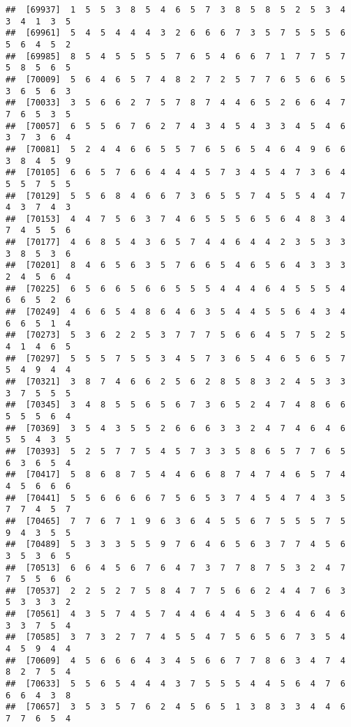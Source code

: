 \documentclass[
]{book}
\begin{document}
\begin{verbatim}
##  [69937]  1  5  5  3  8  5  4  6  5  7  3  8  5  8  5  2  5  3  4  3  4  1  3  5
##  [69961]  5  4  5  4  4  4  3  2  6  6  6  7  3  5  7  5  5  5  6  5  6  4  5  2
##  [69985]  8  5  4  5  5  5  5  7  6  5  4  6  6  7  1  7  7  5  7  5  8  5  6  5
##  [70009]  5  6  4  6  5  7  4  8  2  7  2  5  7  7  6  5  6  6  5  3  6  5  6  3
##  [70033]  3  5  6  6  2  7  5  7  8  7  4  4  6  5  2  6  6  4  7  7  6  5  3  5
##  [70057]  6  5  5  6  7  6  2  7  4  3  4  5  4  3  3  4  5  4  6  3  7  3  6  4
##  [70081]  5  2  4  4  6  6  5  5  7  6  5  6  5  4  6  4  9  6  6  3  8  4  5  9
##  [70105]  6  6  5  7  6  6  4  4  4  5  7  3  4  5  4  7  3  6  4  5  5  7  5  5
##  [70129]  5  5  6  8  4  6  6  7  3  6  5  5  7  4  5  5  4  4  7  4  3  7  4  3
##  [70153]  4  4  7  5  6  3  7  4  6  5  5  5  6  5  6  4  8  3  4  7  4  5  5  6
##  [70177]  4  6  8  5  4  3  6  5  7  4  4  6  4  4  2  3  5  3  3  3  8  5  3  6
##  [70201]  8  4  6  5  6  3  5  7  6  6  5  4  6  5  6  4  3  3  3  2  4  5  6  4
##  [70225]  6  5  6  6  5  6  6  5  5  5  4  4  4  6  4  5  5  5  4  6  6  5  2  6
##  [70249]  4  6  6  5  4  8  6  4  6  3  5  4  4  5  5  6  4  3  4  6  6  5  1  4
##  [70273]  5  3  6  2  2  5  3  7  7  7  5  6  6  4  5  7  5  2  5  4  1  4  6  5
##  [70297]  5  5  5  7  5  5  3  4  5  7  3  6  5  4  6  5  6  5  7  5  4  9  4  4
##  [70321]  3  8  7  4  6  6  2  5  6  2  8  5  8  3  2  4  5  3  3  3  7  5  5  5
##  [70345]  3  4  8  5  5  6  5  6  7  3  6  5  2  4  7  4  8  6  6  5  5  5  6  4
##  [70369]  3  5  4  3  5  5  2  6  6  6  3  3  2  4  7  4  6  4  6  5  5  4  3  5
##  [70393]  5  2  5  7  7  5  4  5  7  3  3  5  8  6  5  7  7  6  5  6  3  6  5  4
##  [70417]  5  8  6  8  7  5  4  4  6  6  8  7  4  7  4  6  5  7  4  4  5  6  6  6
##  [70441]  5  5  6  6  6  6  7  5  6  5  3  7  4  5  4  7  4  3  5  7  7  4  5  7
##  [70465]  7  7  6  7  1  9  6  3  6  4  5  5  6  7  5  5  5  7  5  9  4  3  5  5
##  [70489]  5  3  3  3  5  5  9  7  6  4  6  5  6  3  7  7  4  5  6  3  5  3  6  5
##  [70513]  6  6  4  5  6  7  6  4  7  3  7  7  8  7  5  3  2  4  7  7  5  5  6  6
##  [70537]  2  2  5  2  7  5  8  4  7  7  5  6  6  2  4  4  7  6  3  5  3  3  3  2
##  [70561]  4  3  5  7  4  5  7  4  4  6  4  4  5  3  6  4  6  4  6  3  3  7  5  4
##  [70585]  3  7  3  2  7  7  4  5  5  4  7  5  6  5  6  7  3  5  4  4  5  9  4  4
##  [70609]  4  5  6  6  6  4  3  4  5  6  6  7  7  8  6  3  4  7  4  8  2  7  5  4
##  [70633]  5  5  6  5  4  4  4  3  7  5  5  5  4  4  5  6  4  7  6  6  6  4  3  8
##  [70657]  3  5  3  5  7  6  2  4  5  6  5  1  3  8  3  3  4  4  6  7  7  6  5  4

\end{verbatim}
\end{document}
